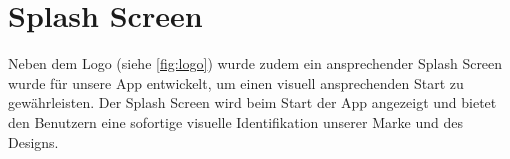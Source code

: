 \section{Splash Screen}
Neben dem Logo (siehe \ref{fig:logo}) wurde zudem ein ansprechender Splash Screen wurde für unsere App entwickelt, 
um einen visuell ansprechenden Start zu gewährleisten. 
Der Splash Screen wird beim Start der App angezeigt und bietet den Benutzern eine sofortige visuelle Identifikation unserer 
Marke und des Designs.